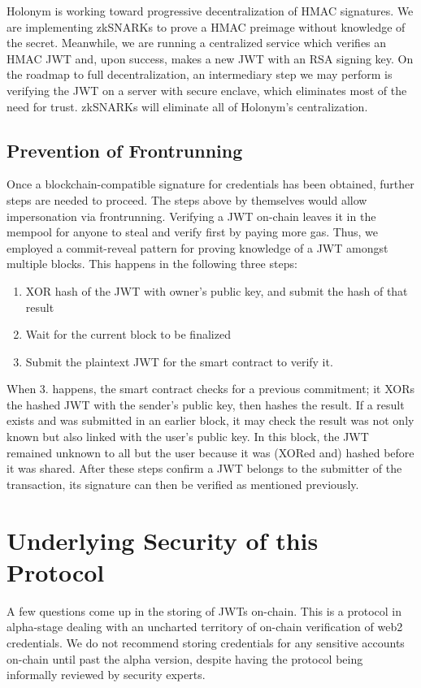 \documentclass[11pt,oneside,a4paper]{article}
\begin{document}
		Holonym is working toward progressive decentralization of HMAC signatures. We are implementing zkSNARKs to prove a HMAC preimage without knowledge of the secret.  Meanwhile, we are running a centralized service which verifies an HMAC JWT and, upon success, makes a new JWT with an RSA signing key. On the roadmap to full decentralization, an intermediary step we may perform is verifying the JWT on a server with secure enclave, which eliminates most of the need for trust. zkSNARKs will eliminate all of Holonym's centralization.
			
		\subsection*{Prevention of Frontrunning}
			Once a blockchain-compatible  signature for credentials has been obtained, further steps are needed to proceed. The steps above by themselves would allow impersonation via frontrunning. Verifying a JWT on-chain leaves it in the mempool for anyone to steal and verify first by paying more gas. Thus, we employed a commit-reveal pattern for proving knowledge of a JWT amongst multiple blocks. This happens in the following three steps:
			\begin{enumerate}
				\item XOR hash of the JWT with owner's public key, and submit the hash of that result
				\item Wait for the current block to be finalized
				\item Submit the plaintext JWT for the smart contract to verify it.
			\end{enumerate}	  
			When 3. happens, the smart contract checks for a previous commitment; it XORs the hashed JWT with the sender's public key, then hashes the result. If a result exists and was submitted in an earlier block, it may check the result was not only known but also linked with the user's public key. In this block, the JWT remained unknown to all but the user because it was (XORed and) hashed before it was shared. After these steps confirm a JWT belongs to the submitter of the transaction, its signature can then be verified as mentioned previously. 
	\section*{Underlying Security of this Protocol}
		A few questions come up in the storing of JWTs on-chain. This is a protocol in alpha-stage dealing with an uncharted territory of on-chain verification of web2 credentials. We do not recommend storing credentials for any sensitive accounts on-chain until past the alpha version, despite having the protocol being informally reviewed by security experts.
		
\end{document}
